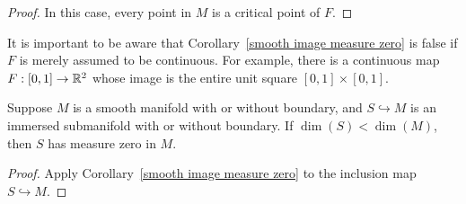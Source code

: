 \begin{proof}
In this case, every point in $M$ is a critical point of $F$.
\end{proof}
It is important to be aware that Corollary~\ref{smooth image measure zero} is false if $F$ is merely assumed to be continuous. For example, there is a continuous map $F:[0,1]\to\mathbb{R}^2$ whose image is the entire unit square $[0,1]\times[0,1]$.
\begin{corollary}\label{submani measure zero}
Suppose $M$ is a smooth manifold with or without boundary, and $S\hookrightarrow M$ is an immersed submanifold with or without boundary. If $\dim(S)<\dim(M)$, then $S$ has measure zero in $M$.
\end{corollary}
\begin{proof}
Apply Corollary~\ref{smooth image measure zero} to the inclusion map $S\hookrightarrow M$.
\end{proof}

